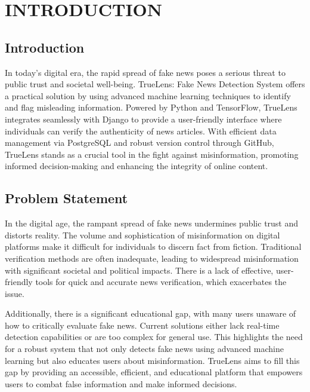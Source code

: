 \chapter{INTRODUCTION}



\section{Introduction}
In today’s digital era, the rapid spread of fake news poses a serious threat to public trust and societal well-being. TrueLens: Fake News Detection System offers a practical solution by using advanced machine learning techniques to identify and flag misleading information. Powered by Python and TensorFlow, TrueLens integrates seamlessly with Django to provide a user-friendly interface where individuals can verify the authenticity of news articles. With efficient data management via PostgreSQL and robust version control through GitHub, TrueLens stands as a crucial tool in the fight against misinformation, promoting informed decision-making and enhancing the integrity of online content.


\section{Problem Statement}

In the digital age, the rampant spread of fake news undermines public trust and distorts reality. The volume and sophistication of misinformation on digital platforms make it difficult for individuals to discern fact from fiction. Traditional verification methods are often inadequate, leading to widespread misinformation with significant societal and political impacts. There is a lack of effective, user-friendly tools for quick and accurate news verification, which exacerbates the issue.

Additionally, there is a significant educational gap, with many users unaware of how to critically evaluate fake news. Current solutions either lack real-time detection capabilities or are too complex for general use. This highlights the need for a robust system that not only detects fake news using advanced machine learning but also educates users about misinformation. TrueLens aims to fill this gap by providing an accessible, efficient, and educational platform that empowers users to combat false information and make informed decisions.


